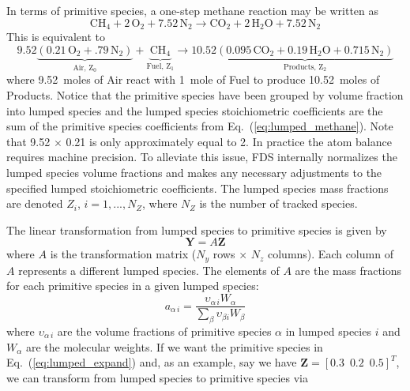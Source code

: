 In terms of primitive species, a one-step methane reaction may be written as
\begin{equation}\label{eq:lumped_methane}
\mbox{CH}_4 + 2\, \mbox{O}_2+7.52\,\mbox{N}_2 \rightarrow \mbox{CO}_2+2\,\mbox{H}_2\mbox{O}+7.52\,\mbox{N}_2
\end{equation}
This is equivalent to
\begin{equation}\label{eq:lumped_expand}
\mathrm{9.52\underbrace{(0.21\,\mbox{O}_2+.79\,\mbox{N}_2)}_\text{Air, $Z_0$}+\underbrace{\mbox{CH}_4}_\text{Fuel,~$Z_1$} \rightarrow 10.52\underbrace{(0.095\,\mbox{CO}_2+0.19\,\mbox{H}_2\mbox{O}+0.715\,\mbox{N}_2)}_\text{Products,~$Z_2$}}
\end{equation}
where 9.52~moles of Air react with 1~mole of Fuel to produce 10.52~moles of Products. Notice that the primitive species have been grouped by volume fraction into lumped species and the lumped species stoichiometric coefficients are the sum of the primitive species coefficients from Eq.~(\ref{eq:lumped_methane}). Note that 9.52 $\times$ 0.21 is only approximately equal to 2. In practice the atom balance requires machine precision. To alleviate this issue, FDS internally normalizes the lumped species volume fractions and makes any necessary adjustments to the specified lumped stoichiometric coefficients. The lumped species mass fractions are denoted $Z_i$, $i=1,...,N_Z$, where $N_Z$ is the number of tracked species.

The linear transformation from lumped species to primitive species is given by
\begin{equation}\label{eq:transform}
\textbf{Y}=A\textbf{Z}
\end{equation}
where $A$ is the transformation matrix ($N_{y}$ rows $\times$ $N_{z}$ columns).  Each column of $A$ represents a different lumped species.  The elements of $A$ are the mass fractions for each primitive species in a given lumped species:
\begin{equation}\label{eq:A_def}
a_{\alpha\,i} = \frac{\upsilon_{\alpha\,i}W_{\alpha}}{\displaystyle \sum_{\beta}\upsilon_{\beta i}W_{\beta}}
\end{equation}
where $\upsilon_{\alpha\,i}$ are the volume fractions of primitive species $\alpha$ in lumped species $i$ and $W_\alpha$ are the molecular weights. If we want the primitive species in Eq.~(\ref{eq:lumped_expand}) and, as an example, say we have $\mathbf{Z} = [0.3 \,\,\, 0.2 \,\,\, 0.5]^T$, we can transform from lumped species to primitive species via

